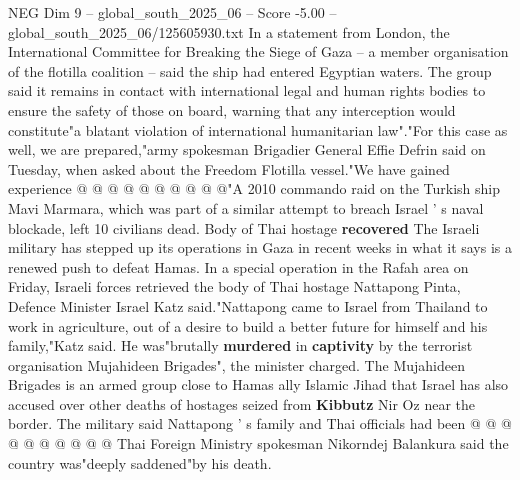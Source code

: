 \begin{textsample}{NEG Dim 9 – global\_south\_2025\_06 – Score -5.00 – global\_south\_2025\_06/125605930.txt}
In a statement from London, the International Committee for Breaking the Siege of Gaza -- a member organisation of the flotilla coalition -- said the ship had entered Egyptian waters.
The group said it remains in contact with international legal and human rights bodies to ensure the safety of those on board, warning that any interception would constitute"a blatant violation of international humanitarian law"."For this case as well, we are prepared,"army spokesman Brigadier General Effie Defrin said on Tuesday, when asked about the Freedom Flotilla vessel."We have gained experience @ @ @ @ @ @ @ @ @ @"A 2010 commando raid on the Turkish ship Mavi Marmara, which was part of a similar attempt to breach Israel ' s naval blockade, left 10 civilians dead.
Body of Thai hostage \textbf{recovered} The Israeli military has stepped up its operations in Gaza in recent weeks in what it says is a renewed push to defeat Hamas.
In a special operation in the Rafah area on Friday, Israeli forces retrieved the body of Thai hostage Nattapong Pinta, Defence Minister Israel Katz said."Nattapong came to Israel from Thailand to work in agriculture, out of a desire to build a better future for himself and his family,"Katz said.
He was"brutally \textbf{murdered} in \textbf{captivity} by the terrorist organisation Mujahideen Brigades", the minister charged.
The Mujahideen Brigades is an armed group close to Hamas ally Islamic Jihad that Israel has also accused over other deaths of hostages seized from \textbf{Kibbutz} Nir Oz near the border.
The military said Nattapong ' s family and Thai officials had been @ @ @ @ @ @ @ @ @ @ Thai Foreign Ministry spokesman Nikorndej Balankura said the country was"deeply saddened"by his death.

\end{textsample}
